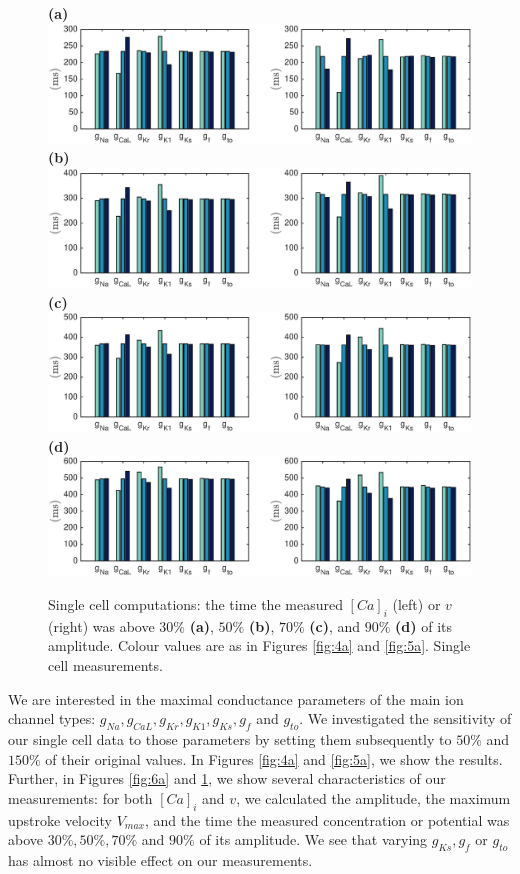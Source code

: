 \documentclass[12pt,a4paper]{article}
\begin{document}
\begin{figure}
 \textbf{(a)}  \includegraphics[trim=1cm 0cm 2cm 0cm, clip=true, width=1\linewidth]{sc_30p} 
 \textbf{(b)}  \includegraphics[trim=1cm 0cm 2cm 0cm, clip=true, width=1\linewidth]{sc_50p} 
 \textbf{(c)}   \includegraphics[trim=1cm 0cm 2cm 0cm, clip=true, width=1\linewidth]{sc_70p} 
  \textbf{(d)}   \includegraphics[trim=1cm 0cm 2cm 0cm, clip=true, width=1\linewidth]{sc_90p} 
    \caption{Single cell computations: the time the measured $[Ca]_i$ (left) or $v$ (right) was above $30\%$ \textbf{(a)}, $50\%$ \textbf{(b)}, $70\%$ \textbf{(c)}, and $90\%$ \textbf{(d)} of its amplitude. Colour values are as in Figures \ref{fig:4a} and \ref{fig:5a}. Single cell measurements.}
    \label{fig:7a}
\end{figure}
We are interested in the maximal conductance parameters of the main ion channel types: $g_{Na}, g_{CaL}, g_{Kr}, g_{K1}, g_{Ks}, g_{f}$ and $g_{to}$. We investigated the sensitivity of our single cell data to those parameters by setting them subsequently to $50\%$ and $150\%$ of their original values. In Figures \ref{fig:4a} and \ref{fig:5a}, we show the results. Further, in Figures \ref{fig:6a} and \ref{fig:7a}, we show several characteristics of our measurements: for both $[Ca]_i$ and $v$, we calculated the amplitude, the maximum upstroke velocity $V_{max}$, and the time the measured concentration or potential was above $30\%, 50\%, 70\%$ and $90\%$ of its amplitude. We see that varying $g_{Ks}, g_{f}$ or $g_{to}$ has almost no visible effect on our measurements.
\end{document}

